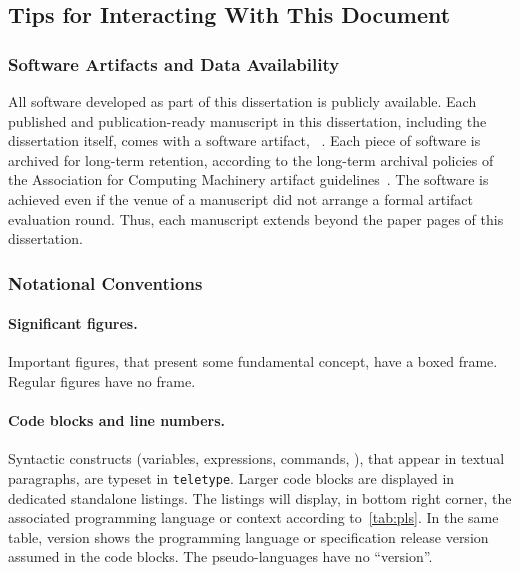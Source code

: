 \subsection{Tips for Interacting With This Document}
\label{subsec:tips}

\subsubsection{Software Artifacts and Data Availability}\label{subsub:sw}

All software developed as part of this dissertation is publicly available.
Each published and publication-ready manuscript in this dissertation, including the dissertation itself, comes with a software artifact, \cf~.
Each piece of software is archived for long-term retention, according to the long-term archival policies of the Association for Computing Machinery artifact guidelines~\cite{acm_badging}.
The software is achieved even if the venue of a manuscript did not arrange a formal artifact evaluation round.
Thus, each manuscript extends beyond the paper pages of this dissertation.

\subsubsection{Notational Conventions}

\paragraph*{Significant figures.}
Important figures, that present some fundamental concept, have a boxed frame.
Regular figures have no frame.

\paragraph*{Code blocks and line numbers.}
Syntactic constructs (variables, expressions, commands, \etc), that appear in textual paragraphs, are typeset in \texttt{teletype}.
Larger code blocks are displayed in dedicated standalone listings.
The listings will display, in bottom right corner, the associated programming language or context according to~\autoref{tab:pls}.
In the same table, version shows the programming language or specification release version assumed in the code blocks.
The pseudo-languages have no \enquote{version}.

